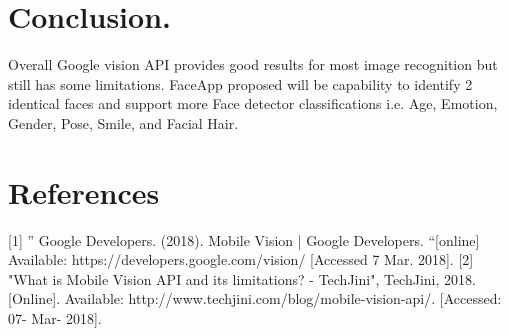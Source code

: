\documentclass[12pt, letterpaper]{article}
\begin{document}
\section{Conclusion.} 
	Overall Google vision API provides good results for most image recognition but still has some limitations. FaceApp proposed will be capability to identify 2 identical faces and support more Face detector classifications i.e. Age, Emotion, Gender, Pose, Smile, and Facial Hair.
\section{References}
	[1]	” Google Developers. (2018). Mobile Vision | Google Developers. “[online] Available: https://developers.google.com/vision/ [Accessed 7 Mar. 2018].
	[2]	"What is Mobile Vision API and its limitations? - TechJini", TechJini, 2018. [Online]. Available: http://www.techjini.com/blog/mobile-vision-api/. [Accessed: 07- Mar- 2018].
\end{document}
